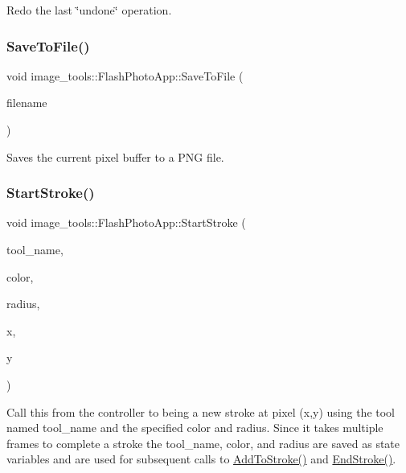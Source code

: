 Redo the last \char`\"{}undone\char`\"{} operation. \mbox{\label{classimage__tools_1_1FlashPhotoApp_a292e1e58a4848cbf055def1ad0acd79a}} 
\subsubsection{\texorpdfstring{Save\+To\+File()}{SaveToFile()}}
{\footnotesize\ttfamily void image\+\_\+tools\+::\+Flash\+Photo\+App\+::\+Save\+To\+File (\begin{DoxyParamCaption}\item[{const std\+::string \&}]{filename }\end{DoxyParamCaption})}

Saves the current pixel buffer to a P\+NG file. \mbox{\label{classimage__tools_1_1FlashPhotoApp_ab40b6ecc2ba4caa35b8e18f091b67253}} 
\subsubsection{\texorpdfstring{Start\+Stroke()}{StartStroke()}}
{\footnotesize\ttfamily void image\+\_\+tools\+::\+Flash\+Photo\+App\+::\+Start\+Stroke (\begin{DoxyParamCaption}\item[{const std\+::string \&}]{tool\+\_\+name,  }\item[{const \hyperlink{classimage__tools_1_1ColorData}{Color\+Data} \&}]{color,  }\item[{float}]{radius,  }\item[{int}]{x,  }\item[{int}]{y }\end{DoxyParamCaption})}

Call this from the controller to being a new stroke at pixel (x,y) using the tool named tool\+\_\+name and the specified color and radius. Since it takes multiple frames to complete a stroke the tool\+\_\+name, color, and radius are saved as state variables and are used for subsequent calls to \hyperlink{classimage__tools_1_1FlashPhotoApp_a1ede0fe70602cbe2d50a3123eda8a937}{Add\+To\+Stroke()} and \hyperlink{classimage__tools_1_1FlashPhotoApp_a34682088e7957ea5e5adf084d2a292a8}{End\+Stroke()}. \mbox{\label{classimage__tools_1_1FlashPhotoApp_a03106fe64664faa7eedab93bd91b6b11}} 
